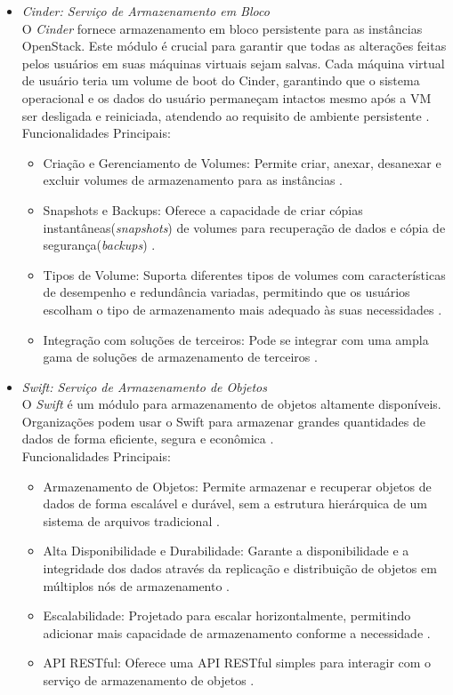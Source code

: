 \begin{itemize}
\begin{itemize}
    \item \emph{Cinder: Serviço de Armazenamento em Bloco}\\
    O  \textit{Cinder} fornece armazenamento em bloco persistente para as instâncias OpenStack. Este módulo é crucial para garantir que todas as alterações feitas pelos usuários em suas máquinas virtuais sejam salvas. Cada máquina virtual de usuário teria um volume de boot do Cinder, garantindo que o sistema operacional e os dados do usuário permaneçam intactos mesmo após a VM ser desligada e reiniciada, atendendo ao requisito de ambiente persistente \cite{openstackcinder}.\\
    Funcionalidades Principais:
    \begin{itemize}
        \item Criação e Gerenciamento de Volumes: Permite criar, anexar, desanexar e excluir volumes de armazenamento para as instâncias \cite{openstackcinder}.
        \item Snapshots e Backups: Oferece a capacidade de criar cópias instantâneas(\textit{snapshots}) de volumes para recuperação de dados e cópia de segurança(\textit{backups}) \cite{openstackcinder}.
        \item Tipos de Volume: Suporta diferentes tipos de volumes com características de desempenho e redundância variadas, permitindo que os usuários escolham o tipo de armazenamento mais adequado às suas necessidades \cite{openstackcinder}.
        \item Integração com  soluções de terceiros: Pode se integrar com uma ampla gama de soluções de armazenamento de terceiros \cite{openstackcinder}.
    \end{itemize}

    \item \emph{Swift: Serviço de Armazenamento de Objetos}\\
    O  \textit{Swift} é um módulo para armazenamento de objetos altamente disponíveis. Organizações podem usar o Swift para armazenar grandes quantidades de dados de forma eficiente, segura e econômica \cite{openstackswift}.\\
    Funcionalidades Principais:
    \begin{itemize}
        \item Armazenamento de Objetos: Permite armazenar e recuperar objetos de dados de forma escalável e durável, sem a estrutura hierárquica de um sistema de arquivos tradicional \cite{openstackswift}.
        \item Alta Disponibilidade e Durabilidade: Garante a disponibilidade e a integridade dos dados através da replicação e distribuição de objetos em múltiplos nós de armazenamento  \cite{openstackswift}.
        \item Escalabilidade: Projetado para escalar horizontalmente, permitindo adicionar mais capacidade de armazenamento conforme a necessidade  \cite{openstackswift}.
        \item API RESTful: Oferece uma API RESTful simples para interagir com o serviço de armazenamento de objetos  \cite{openstackswift}.
    \end{itemize}
\end{itemize}


\end{itemize}
